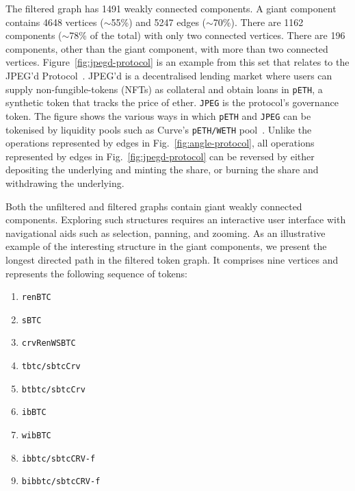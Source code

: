 The filtered graph has \num{1491} weakly connected components.  A
giant component contains \num{4648} vertices ($\sim$\num{55}\%) and
\num{5247} edges ($\sim$\num{70}\%).  There are \num{1162} components
($\sim$\num{78}\% of the total) with only two connected vertices.
There are \num{196} components, other than the giant component, with
more than two connected vertices.  Figure~\ref{fig:jpegd-protocol} is
an example from this set that relates to the JPEG'd
Protocol~\cite{jpegd-xx}.  JPEG'd is a decentralised lending market
where users can supply non-fungible-tokens (NFTs) as collateral and
obtain loans in \texttt{pETH}, a synthetic token that tracks the price
of ether. \texttt{JPEG} is the protocol's governance token.  The
figure shows the various ways in which \texttt{pETH} and \texttt{JPEG}
can be tokenised by liquidity pools such as Curve's \texttt{pETH/WETH}
pool~\cite{curve-finance-xx}. Unlike the operations represented by
edges in Fig.~\ref{fig:angle-protocol}, all operations represented by
edges in Fig.~\ref{fig:jpegd-protocol} can be reversed by either
depositing the underlying and minting the share, or burning the share
and withdrawing the underlying.

Both the unfiltered and filtered graphs contain giant weakly connected
components.  Exploring such structures requires an interactive user
interface with navigational aids such as selection, panning, and
zooming.  As an illustrative example of the interesting structure in
the giant components, we present the longest directed path in the
filtered token graph.  It comprises nine vertices and represents the
following sequence of tokens:

\begin{multicols}{2}
\begin{enumerate}[font=\small]
\item \texttt{renBTC}%
\item \texttt{sBTC}%
\item \texttt{crvRenWSBTC}%
\item \texttt{tbtc/sbtcCrv}%
\item \texttt{btbtc/sbtcCrv}%
\item \texttt{ibBTC}%
\item \texttt{wibBTC}%
\item \texttt{ibbtc/sbtcCRV-f}%
\item \texttt{bibbtc/sbtcCRV-f}%
\end{enumerate}
\end{multicols}

